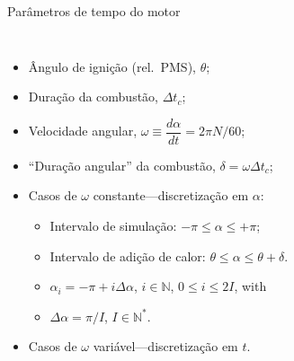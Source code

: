     \begin{frame}{Parâmetros de tempo do motor}\vspace*{-2em}
        \begin{columns}
        \vspace*{-1.0em}\begin{itemize}
            \item<1-> \alert{Ângulo} de ignição (rel.~PMS), \alert{$\theta$};
            \item<2-> \alert{Duração} da combustão, \alert{$\Delta t_c$};
            \item<3-> \alert{Velocidade angular}, \alert{$\omega \equiv \dfrac{d\alpha}{dt} =
                2\pi N/60$};
            \item<4-> ``\alert{Duração angular}'' da combustão, \alert{$\delta = \omega\Delta t_c$};
                \\[\medskipamount]
            \item<5-> Casos de \alert{$\omega$ constante}---discretização em $\alpha$:
            \begin{itemize}
                \item<5-> Intervalo de simulação: \alert{$-\pi \leqslant \alpha \leqslant +\pi$};
                \item<6-> Intervalo de adição de calor: \alert{$\theta \leqslant \alpha \leqslant
                    \theta+\delta$}.
                \item<7-> \alert{$\alpha_i = -\pi + i\Delta\alpha$}, $i \in \mathbb{N}$,
                          \alert{$0 \leqslant i \leqslant 2I$}, with
                \item<8-> \alert{$\Delta\alpha = \pi/I$},
                          \alert{$I \in \mathbb{N}^*$}.
                    \\[\medskipamount]
            \end{itemize}
            \item<9-> Casos de \alert{$\omega$ variável}---discretização em $t$.
        \end{itemize}
        \begin{center}
        \end{center}
        \end{columns}
    \end{frame}

